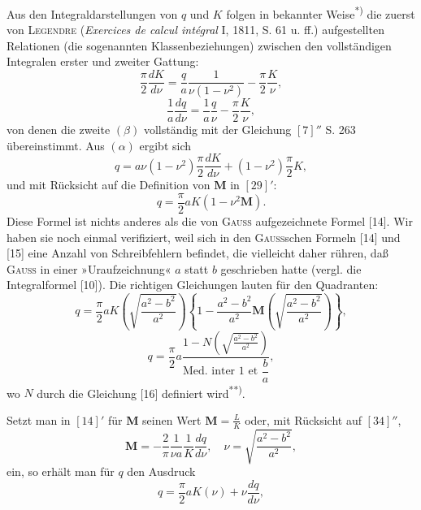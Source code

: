\clearpage
\fancyhead{}
\par\indent Aus den Integraldarstellungen von $q$ und $K$ folgen in bekannter Weise\textsuperscript{*)} die zuerst von \textsc{Legendre} (\textit{Exercices de calcul intégral} I, 1811, S. 61 u. ff.) aufgestellten Relationen (die sogenannten Klassenbeziehungen) zwischen den vollständigen Integralen erster und zweiter Gattung:
\begin{equation*}\tag*{$(\alpha)$}\frac\pi2\frac{dK}{d\nu}=\frac qa\frac1{\nu(1-\nu^2)}-\frac\pi2\frac K\nu,\end{equation*}
\begin{equation*}\tag*{$(\beta)$}\frac1a\frac{dq}{d\nu}=\frac1a\frac q\nu-\frac\pi2\frac K\nu,\end{equation*}
\noindent von denen die zweite $(\beta)$ vollständig mit der Gleichung $[7]''$ S. 263 übereinstimmt. Aus $(\alpha)$ ergibt sich
\[q=a\nu(1-\nu^2)\frac\pi2\frac{dK}{d\nu}+(1-\nu^2)\frac\pi2K,\]
\noindent und mit Rücksicht auf die Definition von $\mathbf M$ in $[29]'$:
\[q=\frac\pi2aK(1-\nu^2\mathbf M).\]
\noindent Diese Formel ist nichts anderes als die von \textsc{Gauss} aufgezeichnete Formel [14]. Wir haben sie noch einmal verifiziert, weil sich in den \textsc{Gauss}schen Formeln [14] und [15] eine Anzahl von Schreibfehlern befindet, die vielleicht daher rühren, daß \textsc{Gauss} in einer »Uraufzeichnung« $a$ statt $b$ geschrieben hatte (vergl. die Integralformel [10]). Die richtigen Gleichungen lauten für den Quadranten:
\begin{equation*}\tag*{$[14]'$}q=\frac\pi2aK\left(\sqrt{\frac{a^2-b^2}{a^2}}\right)\left\{1-\frac{a^2-b^2}{a^2}\mathbf M\left(\sqrt{\frac{a^2-b^2}{a^2}}\right)\right\},\end{equation*}
\begin{equation*}\tag*{$[15]'$}q=\frac\pi2a\frac{1-N\left(\sqrt{\frac{a^2-b^2}{a^2}}\right)}{\text{Med. inter }1\text{ et }\dfrac ba},\end{equation*}
\noindent wo $N$ durch die Gleichung [16] definiert wird\textsuperscript{**)}.
\par\indent Setzt man in $[14]'$ für $\mathbf M$ seinen Wert $\mathbf M=\frac LK$ oder, mit Rücksicht auf $[34]''$,
\[\mathbf M=-\frac2\pi\frac1{\nu a}\frac1K\frac{dq}{d\nu},\quad\nu=\sqrt{\frac{a^2-b^2}{a^2}},\]
\noindent ein, so erhält man für $q$ den Ausdruck
\begin{equation*}\tag*{$[14]''$}q=\frac\pi2aK(\nu)+\nu\frac{dq}{d\nu},\end{equation*}
